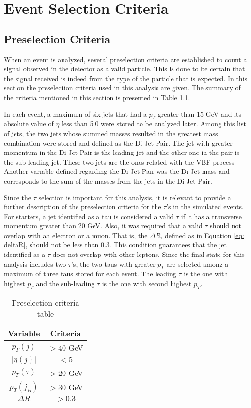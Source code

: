 \chapter{Event Selection Criteria}

\section{Preselection Criteria}

When an event is analyzed, several preselection criteria are established to count a signal observed in the detector as a valid particle. This is done to be certain that the signal received is indeed from the type of the particle that is expected. In this section the preselection criteria used in this analysis are given. The summary of the criteria mentioned in this section is presented in Table \ref{table: preselection}. 

In each event, a maximum of six jets that had a $p_{T}$ greater than 15 GeV and its absolute value of $\eta$ less than 5.0 were stored to be analyzed later. Among this list of jets, the two jets whose summed masses resulted in the greatest mass combination were stored and defined as the Di-Jet Pair. The jet with greater momentum in the Di-Jet Pair is the leading jet and the other one in the pair is the sub-leading jet. These two jets are the ones related with the VBF process. Another variable defined regarding the Di-Jet Pair was the Di-Jet mass and corresponds to the sum of the masses from the jets in the Di-Jet Pair.  

Since the $\tau$ selection is important for this analysis, it is relevant to provide a further description of the preselection criteria for the $\tau$'s in the simulated events. For starters, a jet identified as a tau is considered a valid $\tau$ if it has a transverse momentum greater than 20 GeV. Also, it was required that a valid $\tau$ should not overlap with an electron or a muon. That is, the $\Delta R$, defined as in Equation \ref{eq: deltaR}, should not be less than 0.3. This condition guarantees that the jet identified as a $\tau$ does not overlap with other leptons. Since the final state for this analysis includes two $\tau$'s, the two taus with greater $p_{T}$ are selected among a maximum of three taus stored for each event. The leading $\tau$ is the one with highest $p_{T}$ and the sub-leading $\tau$ is the one with second highest $p_{T}$.

\begin{table}
\centering
\begin{tabular}{|c|c|}
\hline
Variable & Criteria \\
\hline
$p_{T}(j)$ & $> 40$ GeV \\
$|\eta(j)|$ & $< 5$ \\ 
$p_{T}(\tau)$ & $> 20$ GeV \\
$p_{T}(j_{B})$ & $>30$ GeV \\
$\Delta R$ & $>0.3$ \\
\hline
\end{tabular}
\caption{Preselection criteria table}
\label{table: preselection}
\end{table}

